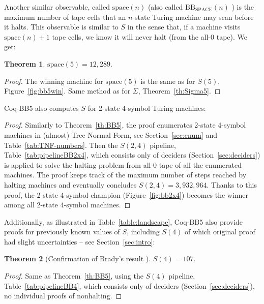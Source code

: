 \documentclass[a4paper,british]{article}
\theoremstyle{definition} %
\newtheorem{theorem}{Theorem}[section]
\numberwithin{equation}{section}
\theoremstyle{definition} %
\newcommand{\BBtheFourth}{107}
\newcommand{\BBTxF}{3{,}932{,}964}
\newcommand{\CoqBB}{Coq-BB5\xspace}
\begin{document}
Another similar observable, called $\text{space}(n)$ \cite{Ben-Amram1996} (also called $\text{BB}_{\text{SPACE}}(n)$ \cite{sterin_2022_14955828}) is the maximum number of tape cells that an $n$-state Turing machine may scan before it halts. This observable is similar to $S$ in the sense that, if a machine visits $\text{space}(n)+1$ tape cells, we know it will never halt (from the all-0 tape). We get:

\begin{theorem}
    $\text{space}(5) = 12{,}289$.
\end{theorem}
\begin{proof}
    The winning machine for $\text{space}(5)$ is the same as for $S(5)$, Figure~\ref{fig:bb5win}.
    Same method as for $\Sigma$, Theorem~\ref{th:Sigma5}.
\end{proof}

\CoqBB also computes $S$ for 2-state 4-symbol Turing machines:

\thBBTxF*

\begin{proof}
    Similarly to Theorem~\ref{th:BB5}, the \Coq proof enumerates 2-state 4-symbol machines in (almost) Tree Normal Form, see Section~\ref{sec:enum} and Table~\ref{tab:TNF-numbers}. Then the $S(2,4)$ pipeline, Table~\ref{tab:pipelineBB2x4}, which consists only of deciders (Section~\ref{sec:deciders}) is applied to solve the halting problem from all-0 tape of all the enumerated machines. The proof keeps track of the maximum number of steps reached by halting machines and eventually concludes $S(2,4) = \BBTxF$. Thanks to this proof, the 2-state 4-symbol champion (Figure~\ref{fig:bb2x4}) becomes the winner among all 2-state 4-symbol machines.
\end{proof}

Additionally, as illustrated in Table~\ref{table:landscape}, \CoqBB also provide \Coq proofs for previously known values of $S$, including $S(4)$ of which original proof \cite{Brady83} had slight uncertainties -- see Section~\ref{sec:intro}:

\begin{theorem}[Confirmation of Brady's result \cite{Brady83}]\label{th:BB4}
    $S(4) = \BBtheFourth$.
\end{theorem}
\begin{proof}
    Same as Theorem~\ref{th:BB5}, using the $S(4)$ pipeline, Table~\ref{tab:pipelineBB4}, which consists only of deciders (Section~\ref{sec:deciders}), \ie no individual proofs of nonhalting.
\end{proof}
\end{document}
